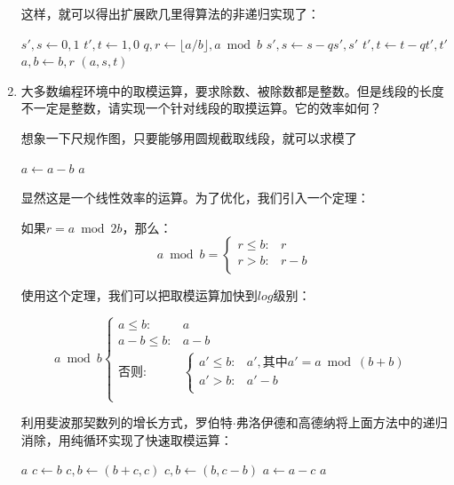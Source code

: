 \documentclass[UTF8]{article}
\begin{document}
\begin{enumerate}
这样，就可以得出扩展欧几里得算法的非递归实现了：

\begin{algorithmic}
  \State $s', s \gets 0, 1$
  \State $t', t \gets 1, 0$
    \State $q, r \gets \lfloor a / b \rfloor, a \bmod b$
    \State $s', s \gets s - q s', s'$
    \State $t', t \gets t - q t', t'$
    \State $a, b \gets b, r$
  \EndWhile
  \State \Return $(a, s, t)$
\EndFunction
\end{algorithmic}

\item 大多数编程环境中的取模运算，要求除数、被除数都是整数。但是线段的长度不一定是整数，请实现一个针对线段的取摸运算。它的效率如何？

想象一下尺规作图，只要能够用圆规截取线段，就可以求模了

\begin{algorithmic}
    \State $a \gets a - b$
  \EndWhile
  \State \Return $a$
\EndFunction
\end{algorithmic}

显然这是一个线性效率的运算。为了优化，我们引入一个定理：

\begin{lemma}[递归求余定理] %
如果$r = a \bmod 2b$，那么：
\[
a \bmod b = \begin{cases}
r \leq b: & r \\
r > b: & r - b \\
\end{cases}
\]
\end{lemma}

使用这个定理，我们可以把取模运算加快到$log$级别：

\[
a \bmod b \begin{cases}
a \leq b: & a \\
a - b \leq b: & a - b \\
\text{否则}: & \begin{cases}
  a' \leq b: & a', \text{其中} a' = a \bmod (b + b) \\
  a' > b: & a' - b \\
  \end{cases} \\
\end{cases}
\]

利用斐波那契数列的增长方式，罗伯特$\cdot$弗洛伊德和高德纳将上面方法中的递归消除，用纯循环实现了快速取模运算：

\begin{algorithmic}
    \State \Return $a$
  \EndIf
  \State $c \gets b$
    \State $c, b \gets (b + c, c)$ 
  \EndWhile
    \State $c, b \gets (b, c - b)$ 
      \State $a \gets a - c$
    \EndIf
  \EndWhile
  \State \Return $a$
\EndFunction
\end{algorithmic}


\end{enumerate}
\end{document}

